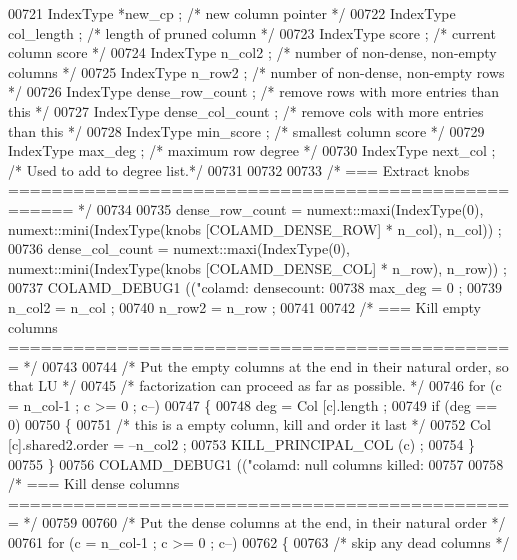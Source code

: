 \begin{DoxyCode}
{{{{{{{{{{00721   IndexType *new\_cp ;   \textcolor{comment}{/* new column pointer */}
00722   IndexType col\_length ;    \textcolor{comment}{/* length of pruned column */}
00723   IndexType score ;     \textcolor{comment}{/* current column score */}
00724   IndexType n\_col2 ;    \textcolor{comment}{/* number of non-dense, non-empty columns */}
00725   IndexType n\_row2 ;    \textcolor{comment}{/* number of non-dense, non-empty rows */}
00726   IndexType dense\_row\_count ; \textcolor{comment}{/* remove rows with more entries than this */}
00727   IndexType dense\_col\_count ; \textcolor{comment}{/* remove cols with more entries than this */}
00728   IndexType min\_score ;   \textcolor{comment}{/* smallest column score */}
00729   IndexType max\_deg ;   \textcolor{comment}{/* maximum row degree */}
00730   IndexType next\_col ;    \textcolor{comment}{/* Used to add to degree list.*/}
00731 
00732 
00733   \textcolor{comment}{/* === Extract knobs ==================================================== */}
00734 
00735   dense\_row\_count = numext::maxi(IndexType(0), numext::mini(IndexType(knobs [COLAMD\_DENSE\_ROW] * n\_col), 
      n\_col)) ;
00736   dense\_col\_count = numext::maxi(IndexType(0), numext::mini(IndexType(knobs [COLAMD\_DENSE\_COL] * n\_row), 
      n\_row)) ;
00737   COLAMD\_DEBUG1 ((\textcolor{stringliteral}{"colamd: densecount: %
00738   max\_deg = 0 ;
00739   n\_col2 = n\_col ;
00740   n\_row2 = n\_row ;
00741 
00742   \textcolor{comment}{/* === Kill empty columns =============================================== */}
00743 
00744   \textcolor{comment}{/* Put the empty columns at the end in their natural order, so that LU */}
00745   \textcolor{comment}{/* factorization can proceed as far as possible. */}
00746   \textcolor{keywordflow}{for} (c = n\_col-1 ; c >= 0 ; c--)
00747   \{
00748     deg = Col [c].length ;
00749     \textcolor{keywordflow}{if} (deg == 0)
00750     \{
00751       \textcolor{comment}{/* this is a empty column, kill and order it last */}
00752       Col [c].shared2.order = --n\_col2 ;
00753       KILL\_PRINCIPAL\_COL (c) ;
00754     \}
00755   \}
00756   COLAMD\_DEBUG1 ((\textcolor{stringliteral}{"colamd: null columns killed: %
00757 
00758   \textcolor{comment}{/* === Kill dense columns =============================================== */}
00759 
00760   \textcolor{comment}{/* Put the dense columns at the end, in their natural order */}
00761   \textcolor{keywordflow}{for} (c = n\_col-1 ; c >= 0 ; c--)
00762   \{
00763     \textcolor{comment}{/* skip any dead columns */}
}}}}}}}}}}}}
\end{DoxyCode}
